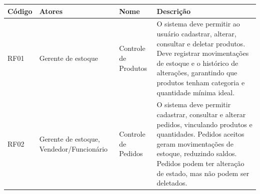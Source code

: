 \documentclass[
	12pt,				%
	openany,			%
	twoside,			%
	a4paper,			%
	english,			%
	brazil				%
	]{abntex2}
\begin{document}
\begin{quadro}[htb]
\centering
\caption{\label{quadro_rf1}Requisitos Funcionais (RF01 a RF02)}
\hspace*{-1cm}
\begin{tabular}{|p{1.4cm}|p{2.8cm}|p{4.5cm}|p{7.0cm}|}
    \hline
    \textbf{Código} & \textbf{Atores} & \textbf{Nome} & \textbf{Descrição} \\ \hline

  RF01 & Gerente de estoque & Controle de Produtos & O sistema deve permitir ao usuário cadastrar, alterar, consultar e deletar produtos. Deve registrar movimentações de estoque e o histórico de alterações, garantindo que produtos tenham categoria e quantidade mínima ideal. \\ \hline

  RF02 & Gerente de estoque, Vendedor/Funcionário & Controle de Pedidos & O sistema deve permitir cadastrar, consultar e alterar pedidos, vinculando produtos e quantidades. Pedidos aceitos geram movimentações de estoque, reduzindo saldos. Pedidos podem ter alteração de estado, mas não podem ser deletados. \\ \hline

   

   

    


\end{tabular}
\end{quadro}
\end{document}
